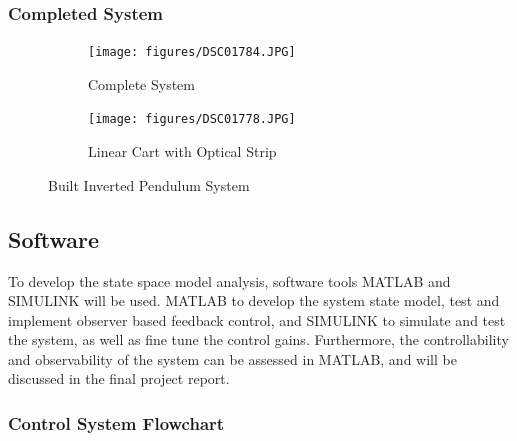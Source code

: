 \documentclass[12pt]{article}
\begin{document}
\subsubsection{Completed System}
\begin{figure}[H]
    \centering
    \begin{subfigure}{.49\textwidth}
      \centering
      \texttt{[image: figures/DSC01784.JPG]}
      \caption{Complete System}
      \label{fig:comp}
    \end{subfigure}%
    \begin{subfigure}{.49\textwidth}
      \centering
      \texttt{[image: figures/DSC01778.JPG]}
      \caption{Linear Cart with Optical Strip}
      \label{fig:compstrip}
    \end{subfigure}
    \caption{Built Inverted Pendulum System}
    \label{fig:invDone}
\end{figure}



\subsection{Software}
To develop the state space model analysis, software tools MATLAB and SIMULINK will be used. MATLAB to develop the system state model, test and implement observer based feedback control, and SIMULINK to simulate and test the system, as well as fine tune the control gains. Furthermore, the controllability and observability of the system can be assessed in MATLAB, and will be discussed in the final project report.

\subsubsection{Control System Flowchart}
\end{document}
